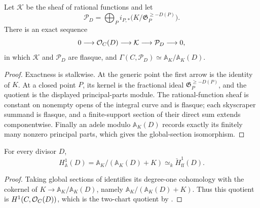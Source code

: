 \begin{proposition}
  \label{thm:adelic_principal_parts_resolution}
  \notready
  Let \(\mathcal K\) be the sheaf of rational functions and let
  \[
    \mathcal P_D=
      \bigoplus_P i_{P,*}
        \bigl(K/\mathfrak G_P^{\ge-D(P)}\bigr).
  \]
  There is an exact sequence
  \[
    0\longrightarrow\mathcal{O}_{C}(D)\longrightarrow\mathcal K
      \longrightarrow\mathcal P_D\longrightarrow0,
  \]
  in which \(\mathcal K\) and \(\mathcal P_D\) are flasque, and
  \(\Gamma(C,\mathcal P_D)\simeq
    \mathbb A_K/\mathbb A_K(D)\).
\end{proposition}
\begin{proof}
  Exactness is stalkwise.  At the generic point the first arrow is the
  identity of \(K\).  At a closed point \(P\), its kernel is the
  fractional ideal \(\mathfrak G_P^{\ge-D(P)}\), and the quotient is the
  displayed principal-parts module.  The rational-function sheaf is
  constant on nonempty opens of the integral curve and is flasque; each
  skyscraper summand is flasque, and a finite-support section of their
  direct sum extends componentwise.  Finally an adele modulo
  \(\mathbb A_K(D)\) records exactly its finitely many nonzero principal
  parts, which gives the global-section isomorphism.
\end{proof}

\begin{proposition}
  \label{thm:adelic_adele_cover_compare}
  \notready
  For every divisor \(D\),
  \[
    H^1_{\mathbb A}(D)
      =\mathbb A_K/(\mathbb A_K(D)+K)
      \simeq_k\check H^1_{\mathrm{ff}}(D).
  \]
\end{proposition}
\begin{proof}
  Taking global sections of
   identifies its degree-one
  cohomology with the cokernel of
  \(K\to\mathbb A_K/\mathbb A_K(D)\), namely
  \(\mathbb A_K/(\mathbb A_K(D)+K)\).  Thus this quotient is
  \(H^1(C,\mathcal{O}_{C}(D))\), which is the two-chart quotient by
  .
\end{proof}

